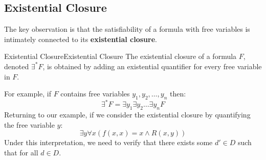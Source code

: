 \documentclass[a4paper]{article}
\theoremstyle{definition}
\begin{document}
\subsection{Existential Closure}
The key observation is that the satisfiability of a formula with free variables is intimately connected to its \textbf{existential closure}.
\begin{definition}{Existential Closure}{Existential Closure}
The existential closure of a formula \( F \), denoted \( \exists^* F \), is obtained by adding an existential quantifier for every free 
variable in \( F \).
\end{definition}
For example, if \( F \) contains free variables \( y_1,y_2, \ldots, y_n \) then:
\[
  \exists^* F = \exists y_1 \exists y_2 \ldots \exists y_n F
\]
Returning to our example, if we consider the existential closure by quantifying the free variable \( y \):
\[
  \exists y \forall x (f(x,x) = x \wedge R(x,y))
\]
Under this interpretation, we need to verify that there exists some \( d' \in D \) such that for all \( d \in D \).
\end{document}
